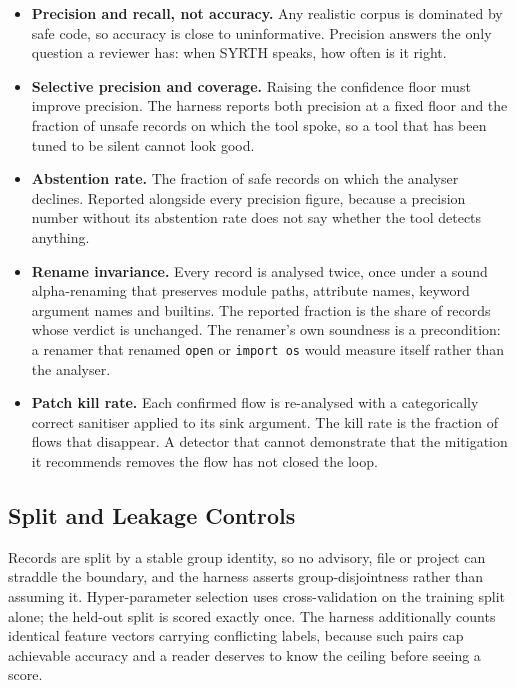 \documentclass[12pt,a4paper]{article}
\begin{document}
\begin{itemize}
    \item \textbf{Precision and recall, not accuracy.} Any realistic corpus is
    dominated by safe code, so accuracy is close to uninformative. Precision
    answers the only question a reviewer has: when SYRTH speaks, how often is it
    right.
    \item \textbf{Selective precision and coverage.} Raising the confidence floor
    must improve precision. The harness reports both precision at a fixed floor
    and the fraction of unsafe records on which the tool spoke, so a tool that
    has been tuned to be silent cannot look good.
    \item \textbf{Abstention rate.} The fraction of safe records on which the
    analyser declines. Reported alongside every precision figure, because a
    precision number without its abstention rate does not say whether the tool
    detects anything.
    \item \textbf{Rename invariance.} Every record is analysed twice, once under
    a sound alpha-renaming that preserves module paths, attribute names, keyword
    argument names and builtins. The reported fraction is the share of records
    whose verdict is unchanged. The renamer's own soundness is a precondition: a
    renamer that renamed \texttt{open} or \texttt{import os} would measure itself
    rather than the analyser.
    \item \textbf{Patch kill rate.} Each confirmed flow is re-analysed with a
    categorically correct sanitiser applied to its sink argument. The kill rate is
    the fraction of flows that disappear. A detector that cannot demonstrate that
    the mitigation it recommends removes the flow has not closed the loop.
\end{itemize}

\subsection{Split and Leakage Controls}

Records are split by a stable group identity, so no advisory, file or project can
straddle the boundary, and the harness asserts group-disjointness rather than
assuming it. Hyper-parameter selection uses cross-validation on the training
split alone; the held-out split is scored exactly once. The harness additionally
counts identical feature vectors carrying conflicting labels, because such pairs
cap achievable accuracy and a reader deserves to know the ceiling before seeing a
score.
\end{document}
